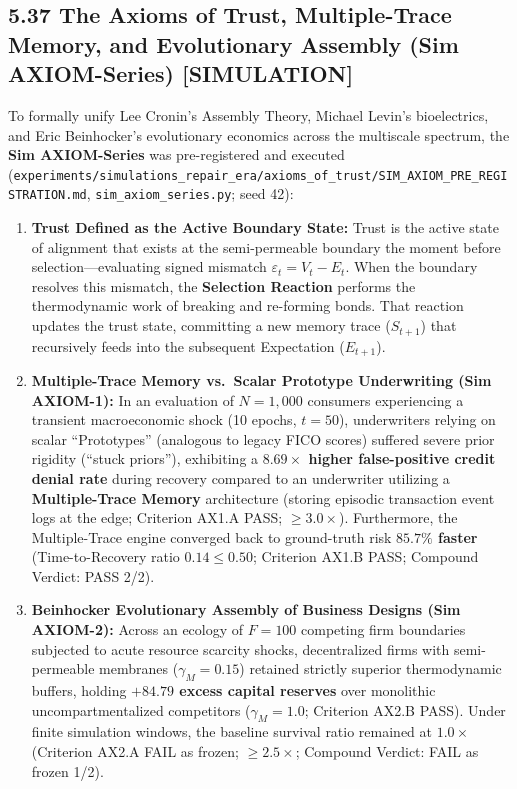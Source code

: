 \documentclass[
]{article}
\providecommand{\tightlist}{%
  \setlength{\itemsep}{0pt}\setlength{\parskip}{0pt}}
\begin{document}
\subsection{5.37 The Axioms of Trust, Multiple-Trace Memory, and
Evolutionary Assembly (Sim AXIOM-Series)
{[}SIMULATION{]}}\label{the-axioms-of-trust-multiple-trace-memory-and-evolutionary-assembly-sim-axiom-series-simulation}

To formally unify Lee Cronin's Assembly Theory, Michael Levin's
bioelectrics, and Eric Beinhocker's evolutionary economics across the
multiscale spectrum, the \textbf{Sim AXIOM-Series} was pre-registered
and executed
(\texttt{experiments/simulations\_repair\_era/axioms\_of\_trust/SIM\_AXIOM\_PRE\_REGISTRATION.md},
\texttt{sim\_axiom\_series.py}; seed 42):

\begin{enumerate}
\def\labelenumi{\arabic{enumi}.}
\tightlist
\item
  \textbf{Trust Defined as the Active Boundary State:} Trust is the
  active state of alignment that exists at the semi-permeable boundary
  the moment before selection---evaluating signed mismatch
  \(\varepsilon_t = V_t - E_t\). When the boundary resolves this
  mismatch, the \textbf{Selection Reaction} performs the thermodynamic
  work of breaking and re-forming bonds. That reaction updates the trust
  state, committing a new memory trace (\(S_{t+1}\)) that recursively
  feeds into the subsequent Expectation (\(E_{t+1}\)).
\item
  \textbf{Multiple-Trace Memory vs.~Scalar Prototype Underwriting (Sim
  AXIOM-1):} In an evaluation of \(N = 1,000\) consumers experiencing a
  transient macroeconomic shock (10 epochs, \(t=50\)), underwriters
  relying on scalar ``Prototypes'' (analogous to legacy FICO scores)
  suffered severe prior rigidity (``stuck priors''), exhibiting a
  \textbf{\(8.69\times\) higher false-positive credit denial rate}
  during recovery compared to an underwriter utilizing a
  \textbf{Multiple-Trace Memory} architecture (storing episodic
  transaction event logs at the edge; Criterion AX1.A PASS;
  \(\ge 3.0\times\)). Furthermore, the Multiple-Trace engine converged
  back to ground-truth risk \textbf{\(85.7\%\) faster} (Time-to-Recovery
  ratio \(0.14 \le 0.50\); Criterion AX1.B PASS; Compound Verdict: PASS
  2/2).
\item
  \textbf{Beinhocker Evolutionary Assembly of Business Designs (Sim
  AXIOM-2):} Across an ecology of \(F = 100\) competing firm boundaries
  subjected to acute resource scarcity shocks, decentralized firms with
  semi-permeable membranes (\(\gamma_M = 0.15\)) retained strictly
  superior thermodynamic buffers, holding \textbf{\(+84.79\) excess
  capital reserves} over monolithic uncompartmentalized competitors
  (\(\gamma_M = 1.0\); Criterion AX2.B PASS). Under finite simulation
  windows, the baseline survival ratio remained at \(1.0\times\)
  (Criterion AX2.A FAIL as frozen; \(\ge 2.5\times\); Compound Verdict:
  FAIL as frozen 1/2).
\end{enumerate}
\end{document}

